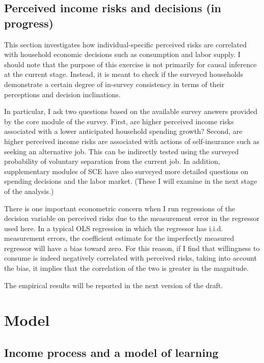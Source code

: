 \documentclass[12pt,notitlepage,onecolumn,aps,pra]{article}
\begin{document}
    \hypertarget{perceived-income-risks-and-decisions-in-progress}{%
\subsection{Perceived income risks and decisions (in
progress)}\label{perceived-income-risks-and-decisions-in-progress}}

This section investigates how individual-specific perceived risks are
correlated with household economic decisions such as consumption and
labor supply. I should note that the purpose of this exercise is not
primarily for causal inference at the current stage. Instead, it is
meant to check if the surveyed households demonstrate a certain degree
of in-survey consistency in terms of their perceptions and decision
inclinations.

In particular, I ask two questions based on the available survey answers
provided by the core module of the survey. First, are higher perceived
income risks associated with a lower anticipated household spending
growth? Second, are higher perceived income risks are associated with
actions of self-insurance such as seeking an alternative job. This can
be indirectly tested using the surveyed probability of voluntary
separation from the current job. In addition, supplementary modules of
SCE have also surveyed more detailed questions on spending decisions and
the labor market. (These I will examine in the next stage of the
analysis.)

There is one important econometric concern when I run regressions of the
decision variable on perceived risks due to the measurement error in the
regressor used here. In a typical OLS regression in which the regressor
has i.i.d. measurement errors, the coefficient estimate for the
imperfectly measured regressor will have a bias toward zero. For this
reason, if I find that willingness to consume is indeed negatively
correlated with perceived risks, taking into account the bias, it
implies that the correlation of the two is greater in the magnitude.

The empirical results will be reported in the next version of the draft.



    \hypertarget{model}{%
\section{Model}\label{model}}

\hypertarget{income-process-and-a-model-of-learning}{%
\subsection{Income process and a model of
learning}\label{income-process-and-a-model-of-learning}}
\end{document}
